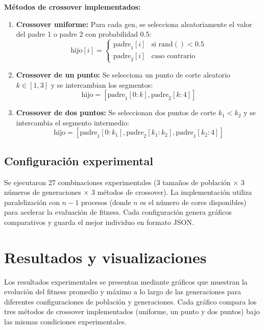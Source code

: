 \documentclass[12pt,a4paper]{article}
\begin{document}
\textbf{Métodos de crossover implementados:}
\begin{enumerate}
    \item \textbf{Crossover uniforme:} Para cada gen, se selecciona aleatoriamente el valor del padre 1 o padre 2 con probabilidad 0.5:
    \begin{equation}
    \text{hijo}[i] =
    \begin{cases}
    \text{padre}_1[i] & \text{si } \text{rand}() < 0.5 \\
    \text{padre}_2[i] & \text{caso contrario}
    \end{cases}
    \end{equation}
    
    \item \textbf{Crossover de un punto:} Se selecciona un punto de corte aleatorio $k \in [1, 3]$ y se intercambian los segmentos:
    \begin{equation}
    \text{hijo} = [\text{padre}_1[0:k], \text{padre}_2[k:4]]
    \end{equation}

    \item \textbf{Crossover de dos puntos:} Se seleccionan dos puntos de corte $k_1 < k_2$ y se intercambia el segmento intermedio:
    \begin{equation}
    \text{hijo} = [\text{padre}_1[0:k_1], \text{padre}_2[k_1:k_2], \text{padre}_1[k_2:4]]
    \end{equation}
\end{enumerate}

\subsection{Configuración experimental}
Se ejecutaron 27 combinaciones experimentales (3 tamaños de población × 3 números de generaciones × 3 métodos de crossover). La implementación utiliza paralelización con $n-1$ procesos (donde $n$ es el número de cores disponibles) para acelerar la evaluación de fitness. Cada configuración genera gráficos comparativos y guarda el mejor individuo en formato JSON.


\section{Resultados y visualizaciones}
Los resultados experimentales se presentan mediante gráficos que muestran la evolución del fitness promedio y máximo a lo largo de las generaciones para diferentes configuraciones de población y generaciones. Cada gráfico compara los tres métodos de crossover implementados (uniforme, un punto y dos puntos) bajo las mismas condiciones experimentales.
\end{document}
